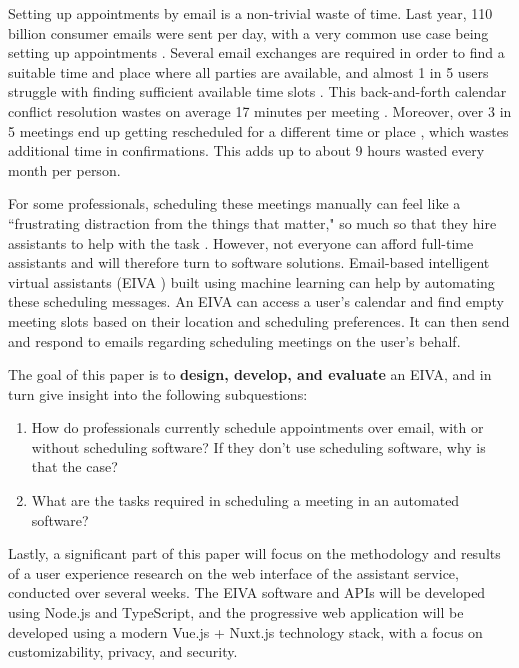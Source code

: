 \documentclass{article}
\begin{document}
Setting up appointments by email is a non-trivial waste of time. Last year, 110 billion consumer emails were sent per day, with a very common use case being setting up appointments \cite{noauthor_email_2019}. Several email exchanges are required in order to find a suitable time and place where all parties are available, and almost 1 in 5 users struggle with finding sufficient available time slots \cite{blaszkiewicz_research_2018}. This back-and-forth calendar conflict resolution wastes on average 17 minutes per meeting \cite{dennis_4_2017}. Moreover, over 3 in 5 meetings end up getting rescheduled for a different time or place \cite{dennis_how_2018}, which wastes additional time in confirmations. This adds up to about 9 hours wasted every month per person.

For some professionals, scheduling these meetings manually can feel like a ``frustrating distraction from the things that matter," so much so that they hire assistants to help with the task \cite{cranshaw_calendarhelp_2017}. However, not everyone can afford full-time assistants and will therefore turn to software solutions. Email-based intelligent virtual assistants (EIVA ) built using machine learning can help by automating these scheduling messages. An EIVA can access a user's calendar and find empty meeting slots based on their location and scheduling preferences. It can then send and respond to emails regarding scheduling meetings on the user's behalf.

The goal of this paper is to \textbf{design, develop, and evaluate} an EIVA, and in turn give insight into the following subquestions:

\begin{enumerate}
	\item How do professionals currently schedule appointments over email, with or without scheduling software? If they don't use scheduling software, why is that the case?
	\item What are the tasks required in scheduling a meeting in an automated software?
\end{enumerate}

Lastly, a significant part of this paper will focus on the methodology and results of a user experience research on the web interface of the assistant service, conducted over several weeks. The EIVA software and APIs will be developed using Node.js and TypeScript, and the progressive web application will be developed using a modern Vue.js + Nuxt.js technology stack, with a focus on customizability, privacy, and security.
\end{document}
